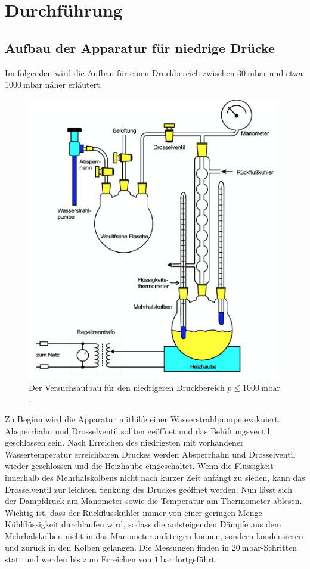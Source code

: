\section{Durchführung}
  \subsection{Aufbau der Apparatur für niedrige Drücke}
    Im folgenden wird die Aufbau für einen Druckbereich zwischen $\SI{30}{\milli\bar}$ und etwa $\SI{1000}{\milli\bar}$ näher
    erläutert.
    \begin{figure}
      \centering
      \label{fig:niedrigedrücke}
      \includegraphics[scale=0.5]{Content/apparaturniedrige.png}
      \caption{Der Versuchsaufbau für den niedrigeren Druckbereich $p \leq \SI{1000}{\milli\bar}$.}
    \end{figure}
    Zu Beginn wird die Apparatur mithilfe einer Wasserstrahlpumpe evakuiert. Absperrhahn und Drosselventil sollten geöffnet und
    das Belüftungsventil geschlossen sein. Nach Erreichen des niedrigsten mit vorhandener Wassertemperatur erreichbaren Druckes
    werden Absperrhahn und Drosselventil wieder geschlossen und die Heizhaube eingeschaltet. Wenn die Flüssigkeit innerhalb
    des Mehrhalskolbens nicht nach kurzer Zeit anfängt zu sieden, kann das Drosselventil zur leichten Senkung des Druckes
    geöffnet werden. Nun lässt sich der Dampfdruck am Manometer sowie die Temperatur am Thermometer ablesen. Wichtig ist, dass
    der Rückflusskühler immer von einer geringen Menge Kühlflüssigkeit durchlaufen wird, sodass die aufsteigenden Dämpfe aus dem
    Mehrhalskolben nicht in das Manometer aufsteigen können, sondern kondensieren und zurück in den Kolben gelangen.
    Die Messungen finden in $\SI{20}{\milli\bar}$-Schritten statt und werden bis zum Erreichen von $\SI{1}{\bar}$ fortgeführt.
